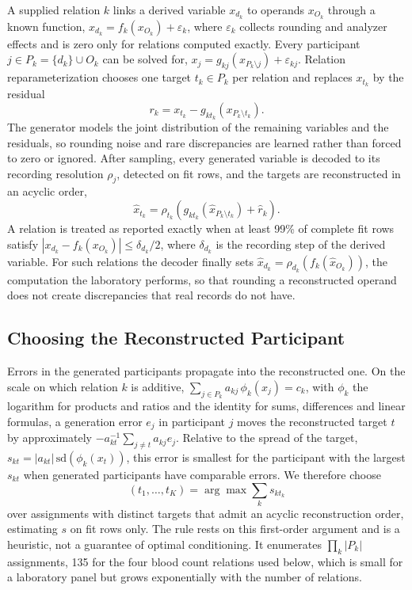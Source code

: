 \documentclass[conference]{IEEEtran}
\begin{document}
A supplied relation $k$ links a derived variable $x_{d_k}$ to operands $x_{O_k}$ through a known function, $x_{d_k} = f_k(x_{O_k}) + \varepsilon_k$, where $\varepsilon_k$ collects rounding and analyzer effects and is zero only for relations computed exactly. Every participant $j \in P_k = \{d_k\} \cup O_k$ can be solved for, $x_j = g_{kj}(x_{P_k \setminus j}) + \varepsilon_{kj}$. Relation reparameterization chooses one target $t_k \in P_k$ per relation and replaces $x_{t_k}$ by the residual
\begin{equation}
r_k = x_{t_k} - g_{k t_k}\!\left(x_{P_k \setminus t_k}\right).
\label{eq:residual}
\end{equation}
The generator models the joint distribution of the remaining variables and the residuals, so rounding noise and rare discrepancies are learned rather than forced to zero or ignored. After sampling, every generated variable is decoded to its recording resolution $\rho_j$, detected on fit rows, and the targets are reconstructed in an acyclic order,
\begin{equation}
\hat{x}_{t_k} = \rho_{t_k}\!\left( g_{k t_k}(\hat{x}_{P_k \setminus t_k}) + \hat{r}_k \right).
\label{eq:decode}
\end{equation}
A relation is treated as reported exactly when at least 99\% of complete fit rows satisfy $|x_{d_k} - f_k(x_{O_k})| \le \delta_{d_k}/2$, where $\delta_{d_k}$ is the recording step of the derived variable. For such relations the decoder finally sets $\hat{x}_{d_k} = \rho_{d_k}(f_k(\hat{x}_{O_k}))$, the computation the laboratory performs, so that rounding a reconstructed operand does not create discrepancies that real records do not have.

\subsection*{Choosing the Reconstructed Participant}

Errors in the generated participants propagate into the reconstructed one. On the scale on which relation $k$ is additive, $\sum_{j \in P_k} a_{kj}\, \phi_k(x_j) = c_k$, with $\phi_k$ the logarithm for products and ratios and the identity for sums, differences and linear formulas, a generation error $e_j$ in participant $j$ moves the reconstructed target $t$ by approximately $-a_{kt}^{-1} \sum_{j \ne t} a_{kj} e_j$. Relative to the spread of the target, $s_{kt} = |a_{kt}|\, \mathrm{sd}(\phi_k(x_t))$, this error is smallest for the participant with the largest $s_{kt}$ when generated participants have comparable errors. We therefore choose
\begin{equation}
(t_1, \dots, t_K) = \arg\max \textstyle\sum_{k} s_{k t_k}
\label{eq:choice}
\end{equation}
over assignments with distinct targets that admit an acyclic reconstruction order, estimating $s$ on fit rows only. The rule rests on this first-order argument and is a heuristic, not a guarantee of optimal conditioning. It enumerates $\prod_k |P_k|$ assignments, 135 for the four blood count relations used below, which is small for a laboratory panel but grows exponentially with the number of relations.
\end{document}
